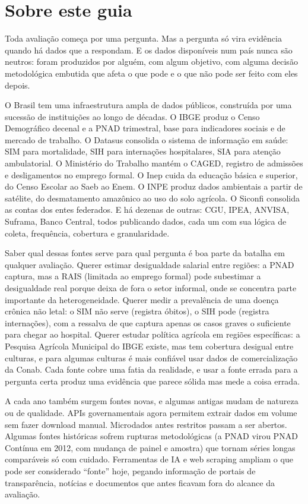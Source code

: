 \documentclass[12pt, a4paper, openany]{book}
\begin{document}
\frontmatter


\thispagestyle{empty}
\section*{Sobre este guia}
Toda avaliação começa por uma pergunta. Mas a pergunta só vira evidência
quando há dados que a respondam. E os dados disponíveis num país nunca
são neutros: foram produzidos por alguém, com algum objetivo, com alguma
decisão metodológica embutida que afeta o que pode e o que não pode ser
feito com eles depois.

O Brasil tem uma infraestrutura ampla de dados públicos, construída por
uma sucessão de instituições ao longo de décadas. O IBGE produz o Censo
Demográfico decenal e a PNAD trimestral, base para indicadores sociais e
de mercado de trabalho. O Datasus consolida o sistema de informação em
saúde: SIM para mortalidade, SIH para internações hospitalares, SIA para
atenção ambulatorial. O Ministério do Trabalho mantém o CAGED, registro
de admissões e desligamentos no emprego formal. O Inep cuida da educação
básica e superior, do Censo Escolar ao Saeb ao Enem. O INPE produz dados
ambientais a partir de satélite, do desmatamento amazônico ao uso do solo
agrícola. O Siconfi consolida as contas dos entes federados. E há
dezenas de outras: CGU, IPEA, ANVISA, Suframa, Banco Central, todos
publicando dados, cada um com sua lógica de coleta, frequência, cobertura
e granularidade.

Saber qual dessas fontes serve para qual pergunta é boa parte da batalha
em qualquer avaliação. Querer estimar desigualdade salarial entre regiões:
a PNAD captura, mas a RAIS (limitada ao emprego formal) pode subestimar
a desigualdade real porque deixa de fora o setor informal, onde se
concentra parte importante da heterogeneidade. Querer medir a prevalência
de uma doença crônica não letal: o SIM não serve (registra óbitos), o SIH
pode (registra internações), com a ressalva de que captura apenas os
casos graves o suficiente para chegar ao hospital. Querer estudar política
agrícola em regiões específicas: a Pesquisa Agrícola Municipal do IBGE
existe, mas tem cobertura desigual entre culturas, e para algumas
culturas é mais confiável usar dados de comercialização da Conab. Cada
fonte cobre uma fatia da realidade, e usar a fonte errada para a pergunta
certa produz uma evidência que parece sólida mas mede a coisa errada.

A cada ano também surgem fontes novas, e algumas antigas mudam de
natureza ou de qualidade. APIs governamentais agora permitem extrair
dados em volume sem fazer download manual. Microdados antes restritos
passam a ser abertos. Algumas fontes históricas sofrem rupturas
metodológicas (a PNAD virou PNAD Contínua em 2012, com mudança de painel
e amostra) que tornam séries longas comparáveis só com cuidado.
Ferramentas de IA e web scraping ampliam o que pode ser considerado
``fonte'' hoje, pegando informação de portais de transparência, notícias
e documentos que antes ficavam fora do alcance da avaliação.
\end{document}
